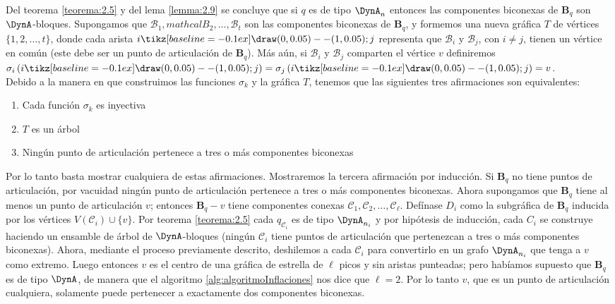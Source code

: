 Del teorema \ref{teorema:2.5} y del lema \ref{lemma:2.9} se concluye que si $q$ es de tipo $\DynA_{n}$ entonces las componentes biconexas de $\textbf{B}_{q}$ son $\DynA$-bloques. Supongamos que $\mathcal{B}_{1}, mathcal{B}_{2}, \ldots, \mathcal{B}_{t}$ son las componentes biconexas de $\textbf{B}_{q}$, y formemos una nueva gráfica $T$ de vértices $\{1, 2, \ldots, t\}$, donde cada arista $i \tikz[baseline=-0.1ex]\draw (0,0.05) -- (1,0.05); j$ representa que $\mathcal{B}_{i}$ y $\mathcal{B}_{j}$, con $i \neq j$, tienen un vértice en común (este debe ser un punto de articulación de $\textbf{B}_{q}$). Más aún, si $\mathcal{B}_{i}$ y $\mathcal{B}_{j}$ comparten el vértice $v$ definiremos $\sigma_{i}\left(i \tikz[baseline=-0.1ex]\draw (0,0.05) -- (1,0.05); j\right) = \sigma_{j}\left(i \tikz[baseline=-0.1ex]\draw (0,0.05) -- (1,0.05); j\right) = v$.\\

Debido a la manera en que construimos las funciones $\sigma_{k}$ y la gráfica $T$, tenemos que las siguientes tres afirmaciones son equivalentes:\\

\begin{enumerate}
\item Cada función $\sigma_{k}$ es inyectiva
\item $T$ es un árbol
\item Ningún punto de articulación pertenece a tres o más componentes biconexas
\end{enumerate}

Por lo tanto basta mostrar cualquiera de estas afirmaciones. Mostraremos la tercera afirmación por inducción. Si $\textbf{B}_{q}$ no tiene puntos de articulación, por vacuidad ningún punto de articulación pertenece a tres o más componentes biconexas. Ahora supongamos que $\textbf{B}_{q}$ tiene al menos un punto de articulación $v$; entonces $\textbf{B}_{q} - v$ tiene componentes conexas $\mathcal{C}_{1}, \mathcal{C}_{2}, \ldots, \mathcal{C}_{\ell}$. Defínase $D_{i}$ como la subgráfica de $\textbf{B}_{q}$ inducida por los vértices $V\left(\mathcal{C}_{i}\right) \cup \{v\}$. Por teorema \ref{teorema:2.5} cada $q_{\mathcal{C}_{i}}$ es de tipo $\DynA_{n_{i}}$ y por hipótesis de inducción, cada $C_{i}$ se construye haciendo un ensamble de árbol de $\DynA$-bloques (ningún $\mathcal{C}_{i}$ tiene puntos de articulación que pertenezcan a tres o más componentes biconexas). Ahora, mediante el proceso previamente descrito, deshilemos a cada $\mathcal{C}_{i}$ para convertirlo en un grafo $\DynA_{n_{i}}$ que tenga a $v$ como extremo. Luego entonces $v$ es el centro de una gráfica de estrella de $\ell$ picos y sin aristas punteadas; pero habíamos supuesto que $\textbf{B}_{q}$ es de tipo $\DynA$, de manera que el algoritmo \ref{alg:algoritmoInflaciones} nos dice que $\ell = 2$. Por lo tanto $v$, que es un punto de articulación cualquiera, solamente puede pertenecer a exactamente dos componentes biconexas.\\

